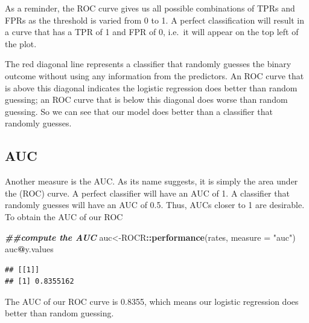 \documentclass[
]{book}
\newenvironment{Shaded}{\begin{snugshade}}{\end{snugshade}}
\newcommand{\AttributeTok}[1]{\textcolor[rgb]{0.13,0.29,0.53}{#1}}
\newcommand{\DocumentationTok}[1]{\textcolor[rgb]{0.56,0.35,0.01}{\textbf{\textit{#1}}}}
\newcommand{\FunctionTok}[1]{\textcolor[rgb]{0.13,0.29,0.53}{\textbf{#1}}}
\newcommand{\NormalTok}[1]{#1}
\newcommand{\OtherTok}[1]{\textcolor[rgb]{0.56,0.35,0.01}{#1}}
\newcommand{\SpecialCharTok}[1]{\textcolor[rgb]{0.81,0.36,0.00}{\textbf{#1}}}
\newcommand{\StringTok}[1]{\textcolor[rgb]{0.31,0.60,0.02}{#1}}
\begin{document}
As a reminder, the ROC curve gives us all possible combinations of TPRs and FPRs as the threshold is varied from 0 to 1. A perfect classification will result in a curve that has a TPR of 1 and FPR of 0, i.e.~it will appear on the top left of the plot.

The red diagonal line represents a classifier that randomly guesses the binary outcome without using any information from the predictors. An ROC curve that is above this diagonal indicates the logistic regression does better than random guessing; an ROC curve that is below this diagonal does worse than random guessing. So we can see that our model does better than a classifier that randomly guesses.

\hypertarget{auc-1}{%
\subsection*{AUC}\label{auc-1}}

Another measure is the AUC. As its name suggests, it is simply the area under the (ROC) curve. A perfect classifier will have an AUC of 1. A classifier that randomly guesses will have an AUC of 0.5. Thus, AUCs closer to 1 are desirable. To obtain the AUC of our ROC

\begin{Shaded}
\begin{Highlighting}[]
\DocumentationTok{\#\#compute the AUC}
\NormalTok{auc}\OtherTok{\textless{}{-}}\NormalTok{ROCR}\SpecialCharTok{::}\FunctionTok{performance}\NormalTok{(rates, }\AttributeTok{measure =} \StringTok{"auc"}\NormalTok{)}
\NormalTok{auc}\SpecialCharTok{@}\NormalTok{y.values}
\end{Highlighting}
\end{Shaded}

\begin{verbatim}
## [[1]]
## [1] 0.8355162
\end{verbatim}

The AUC of our ROC curve is 0.8355, which means our logistic regression does better than random guessing.

  
\end{document}
